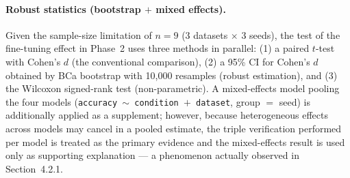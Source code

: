 \paragraph{Robust statistics (bootstrap $+$ mixed effects).}
Given the sample-size limitation of $n = 9$ (3 datasets $\times$ 3 seeds), the
test of the fine-tuning effect in Phase~2 uses three methods in parallel: (1) a
paired $t$-test with Cohen's $d$ (the conventional comparison), (2) a 95\% CI for
Cohen's $d$ obtained by BCa bootstrap with 10,000 resamples (robust estimation),
and (3) the Wilcoxon signed-rank test (non-parametric). A mixed-effects model
pooling the four models (\texttt{accuracy $\sim$ condition $+$ dataset}, group
$=$ seed) is additionally applied as a supplement; however, because heterogeneous
effects across models may cancel in a pooled estimate, the triple verification
performed per model is treated as the primary evidence and the mixed-effects
result is used only as supporting explanation --- a phenomenon actually observed
in Section~4.2.1.
